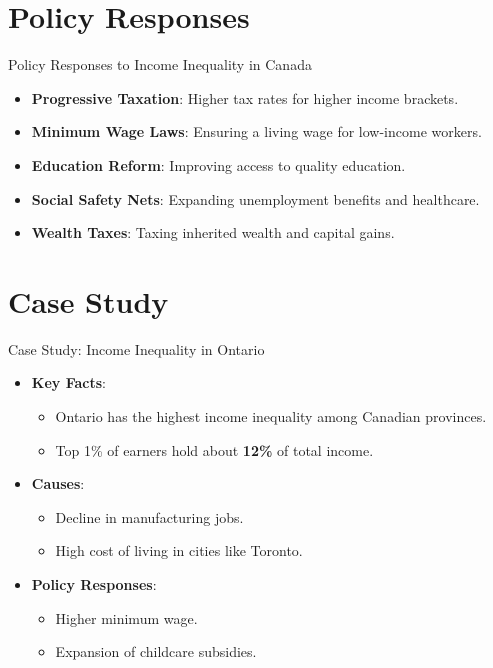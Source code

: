 \documentclass{beamer}
\begin{document}
\section{Policy Responses}

\begin{frame}{Policy Responses to Income Inequality in Canada}
\begin{itemize}
    \item \textbf{Progressive Taxation}: Higher tax rates for higher income brackets.
    \item \textbf{Minimum Wage Laws}: Ensuring a living wage for low-income workers.
    \item \textbf{Education Reform}: Improving access to quality education.
    \item \textbf{Social Safety Nets}: Expanding unemployment benefits and healthcare.
    \item \textbf{Wealth Taxes}: Taxing inherited wealth and capital gains.
\end{itemize}
\end{frame}

\section{Case Study}

\begin{frame}{Case Study: Income Inequality in Ontario}
\begin{itemize}
    \item \textbf{Key Facts}:
        \begin{itemize}
            \item Ontario has the highest income inequality among Canadian provinces.
            \item Top 1\% of earners hold about \textbf{12\%} of total income.
        \end{itemize}
    \item \textbf{Causes}:
        \begin{itemize}
            \item Decline in manufacturing jobs.
            \item High cost of living in cities like Toronto.
        \end{itemize}
    \item \textbf{Policy Responses}:
        \begin{itemize}
            \item Higher minimum wage.
            \item Expansion of childcare subsidies.
        \end{itemize}
\end{itemize}
\end{frame}
\end{document}
